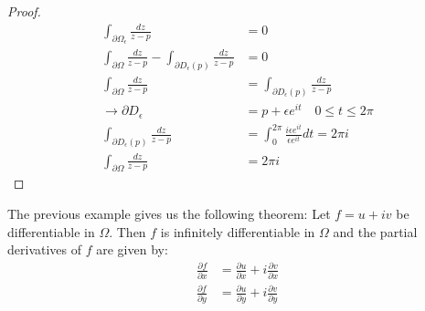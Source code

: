 \begin{example}
\begin{proof}
        \begin{align*} \int_{\partial \Omega_{\epsilon}} \frac{dz}{z - p}                                         & = 0                                                                    \\
               \int_{\partial \Omega} \frac{dz}{z - p} - \int_{\partial D_{\epsilon}(p)} \frac{dz}{z - p} & = 0                                                                    \\
               \int_{\partial \Omega} \frac{dz}{z - p}                                                    & = \int_{\partial D_{\epsilon}(p)} \frac{dz}{z - p}                     \\
               \rightarrow \partial D_{\epsilon}                                                          & = p + \epsilon e^{it} \quad 0 \leq t \leq 2\pi                         \\
               \int_{\partial D_{\epsilon}(p)} \frac{dz}{z - p}                                           & = \int_{0}^{2\pi} \frac{i\epsilon e^{it}}{\epsilon e^{it}} dt = 2\pi i \\
               \int_{\partial \Omega} \frac{dz}{z - p}                                                    & = 2\pi i
        \end{align*}
    \end{proof}

\end{example}


\begin{theorem}
    The previous example gives us the following theorem:
    Let $f = u + iv$ be differentiable in $\Omega$. Then $f$ is infinitely differentiable in $\Omega$ and the partial derivatives of $f$ are given by:
    \begin{align*}
        \frac{\partial f}{\partial x} & = \frac{\partial u}{\partial x} + i\frac{\partial v}{\partial x} \\
        \frac{\partial f}{\partial y} & = \frac{\partial u}{\partial y} + i\frac{\partial v}{\partial y} \\
    \end{align*}
\end{theorem}